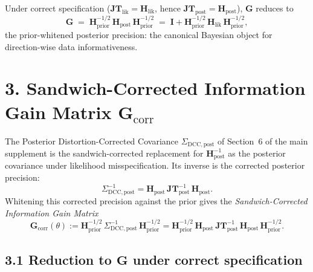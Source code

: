 \documentclass[11pt]{article}
\begin{document}
Under correct specification ($\mathbf{JT}_{\mathrm{lik}} = \mathbf H_{\mathrm{lik}}$, hence $\mathbf{JT}_{\mathrm{post}} = \mathbf H_{\mathrm{post}}$), $\mathbf G$ reduces to
\begin{equation}
\mathbf G \;=\; \mathbf H_{\mathrm{prior}}^{-1/2}\, \mathbf H_{\mathrm{post}}\, \mathbf H_{\mathrm{prior}}^{-1/2}
\;=\;
\mathbf I + \mathbf H_{\mathrm{prior}}^{-1/2}\, \mathbf H_{\mathrm{lik}}\, \mathbf H_{\mathrm{prior}}^{-1/2},
\label{eq:G-correct-spec}
\end{equation}
the prior-whitened posterior precision: the canonical Bayesian object for direction-wise data informativeness.

\section*{3. Sandwich-Corrected Information Gain Matrix $\mathbf G_{\mathrm{corr}}$}

The Posterior Distortion-Corrected Covariance $\Sigma_{\mathrm{DCC},\mathrm{post}}$ of Section~6 of the main supplement is the sandwich-corrected replacement for $\mathbf H_{\mathrm{post}}^{-1}$ as the posterior covariance under likelihood misspecification. Its inverse is the corrected posterior precision:
\begin{equation}
\Sigma_{\mathrm{DCC},\mathrm{post}}^{-1}
=
\mathbf H_{\mathrm{post}}\, \mathbf{JT}_{\mathrm{post}}^{-1}\, \mathbf H_{\mathrm{post}}.
\label{eq:dcc-inverse}
\end{equation}
Whitening this corrected precision against the prior gives the \emph{Sandwich-Corrected Information Gain Matrix}
\begin{equation}
\mathbf G_{\mathrm{corr}}(\theta)
:=
\mathbf H_{\mathrm{prior}}^{-1/2}\,
\Sigma_{\mathrm{DCC},\mathrm{post}}^{-1}\,
\mathbf H_{\mathrm{prior}}^{-1/2}
=
\mathbf H_{\mathrm{prior}}^{-1/2}\,
\mathbf H_{\mathrm{post}}\,
\mathbf{JT}_{\mathrm{post}}^{-1}\,
\mathbf H_{\mathrm{post}}\,
\mathbf H_{\mathrm{prior}}^{-1/2}.
\label{eq:Gcorr-def}
\end{equation}

\subsection*{3.1 Reduction to $\mathbf G$ under correct specification}
\end{document}
